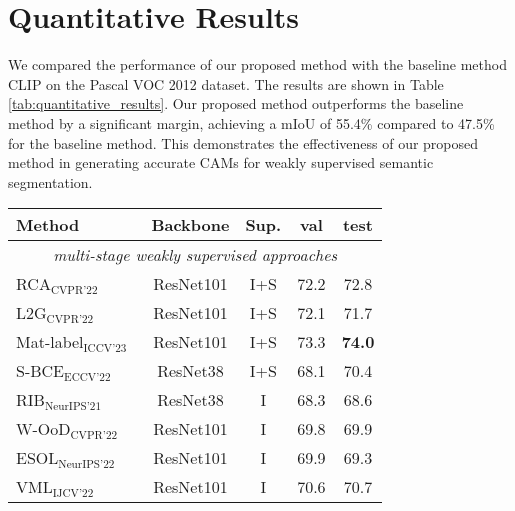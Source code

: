 \section{Quantitative Results}
\label{subsec: Quantitative Results}
We compared the performance of our proposed method with the baseline method CLIP \cite{wsss_frozen_clip} on the Pascal VOC 2012 dataset. The results are shown in Table \ref{tab:quantitative_results}. Our proposed method outperforms the baseline method by a significant margin, achieving a mIoU of 55.4\% compared to 47.5\% for the baseline method. This demonstrates the effectiveness of our proposed method in generating accurate CAMs for weakly supervised semantic segmentation.


\begin{table}[ht]
    \centering
    \renewcommand{\arraystretch}{1.2}
    \setlength{\tabcolsep}{6pt}
    \begin{tabular}{l c c c c}
        \hline
        Method                                                              & Backbone   & Sup. & val           & test          \\
        \hline
        \multicolumn{5}{c}{\textit{multi-stage weakly supervised approaches}}                                                   \\
        RCA$_{\text{CVPR'22}}$~\cite{multi_stage_approaches_RCA}            & ResNet101  & I+S  & 72.2          & 72.8          \\
        L2G$_{\text{CVPR'22}}$~\cite{multi_stage_approaches_L2G}            & ResNet101  & I+S  & 72.1          & 71.7          \\
        Mat-label$_{\text{ICCV'23}}$~\cite{multi_stage_approaches_MatLabel} & ResNet101  & I+S  & 73.3          & \textbf{74.0} \\
        S-BCE$_{\text{ECCV'22}}$~\cite{49}                                  & ResNet38   & I+S  & 68.1          & 70.4          \\
        RIB$_{\text{NeurIPS'21}}$~\cite{23}                                 & ResNet38   & I    & 68.3          & 68.6          \\
        W-OoD$_{\text{CVPR'22}}$~\cite{24}                                  & ResNet101  & I    & 69.8          & 69.9          \\
        ESOL$_{\text{NeurIPS'22}}$~\cite{25}                                & ResNet101  & I    & 69.9          & 69.3          \\
        VML$_{\text{IJCV'22}}$~\cite{38}                                    & ResNet101  & I    & 70.6          & 70.7          \\

\end{tabular}
\end{table}
